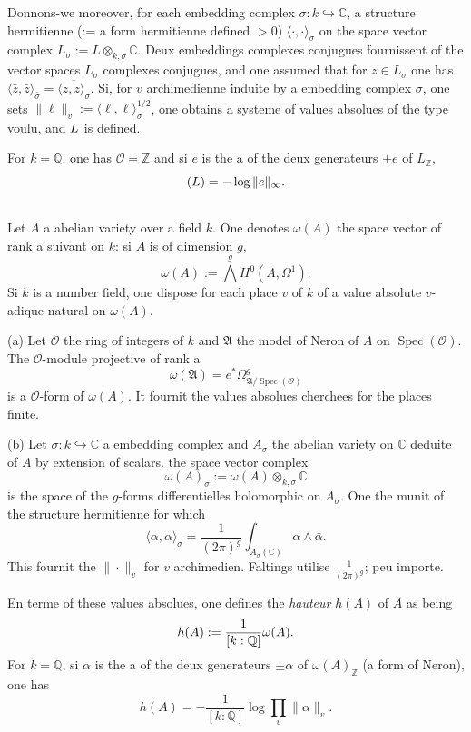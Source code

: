 \documentclass[12pt,a4paper]{article}
\theoremstyle{plain}
\theoremstyle{definition}
\theoremstyle{remark}
\DeclareMathOperator{\Spec}{Spec}
\newcommand{\CC}{\mathbb{C}}
\newcommand{\QQ}{\mathbb{Q}}
\newcommand{\ZZ}{\mathbb{Z}}
\newcommand{\cO}{\mathcal{O}}
\newcommand{\fA}{\mathfrak{A}}
\let\deg\relax
\providecommand{\CC}{\mathbb{C}}
\providecommand{\QQ}{\mathbb{Q}}
\providecommand{\ZZ}{\mathbb{Z}}
\providecommand{\cO}{\mathcal{O}}
\providecommand{\fA}{\mathfrak{A}}
\providecommand{\Spec}{\operatorname{Spec}}
\begin{document}
Donnons-we moreover, for each embedding complex $\sigma : k \hookrightarrow \CC$, a structure hermitienne (:= a form hermitienne defined $> 0$) $\langle\cdot, \cdot\rangle_\sigma$ on the space vector complex $L_\sigma := L \otimes_{k,\sigma} \CC$. Deux embeddings complexes conjugues fournissent of the vector spaces $L_\sigma$ complexes conjugues, and one assumed that for $z \in L_\sigma$ one has $\langle \bar{z}, \bar{z}\rangle_{\bar{\sigma}} = \overline{\langle z, z\rangle_\sigma}$. Si, for $v$ archimedienne induite by a embedding complex $\sigma$, one sets $\|\ell\|_v := \langle \ell, \ell\rangle_\sigma^{1/2}$, one obtains a systeme of values absolues of the type voulu, and $\deg L$ is defined.

For $k = \QQ$, one has $\cO = \ZZ$ and si $e$ is the a of the deux generateurs $\pm e$ of $L_{\ZZ}$,
\[
\deg(L) = -\log \|e\|_\infty.
\]

\subsection{}

Let $A$ a abelian variety over a field $k$. One denotes $\omega(A)$ the space vector of rank a suivant on $k$: si $A$ is of dimension $g$,
\[
\omega(A) := \overset{g}{\bigwedge} H^0(A, \Omega^1).
\]
Si $k$ is a number field, one dispose for each place $v$ of $k$ of a value absolute $v$-adique natural on $\omega(A)$.

(a) Let $\cO$ the ring of integers of $k$ and $\fA$ the model of Neron of $A$ on $\Spec(\cO)$. The $\cO$-module projective of rank a
\[
\omega(\fA) = e^* \Omega^g_{\fA/\Spec(\cO)}
\]
is a $\cO$-form of $\omega(A)$. It fournit the values absolues cherchees for the places finite.

(b) Let $\sigma : k \hookrightarrow \CC$ a embedding complex and $A_\sigma$ the abelian variety on $\CC$ deduite of $A$ by extension of scalars. the space vector complex
\[
\omega(A)_\sigma := \omega(A) \otimes_{k,\sigma} \CC
\]
is the space of the $g$-forms differentielles holomorphic on $A_\sigma$. One the munit of the structure hermitienne for which
\[
\langle \alpha, \alpha \rangle_\sigma = \frac{1}{(2\pi)^g} \int_{A_\sigma(\CC)} \alpha \wedge \bar{\alpha}.
\]
This fournit the $\|\cdot\|_v$ for $v$ archimedien. Faltings utilise $\frac{1}{(2\pi)^g}$; peu importe.

En terme of these values absolues, one defines the \emph{hauteur} $h(A)$ of $A$ as being
\[
h(A) := \frac{1}{[k:\QQ]} \deg \omega(A).
\]
For $k = \QQ$, si $\alpha$ is the a of the deux generateurs $\pm \alpha$ of $\omega(A)_{\ZZ}$ (a form of Neron), one has
\[
h(A) = -\frac{1}{[k:\QQ]} \log \prod_v \|\alpha\|_v.
\]
\end{document}
